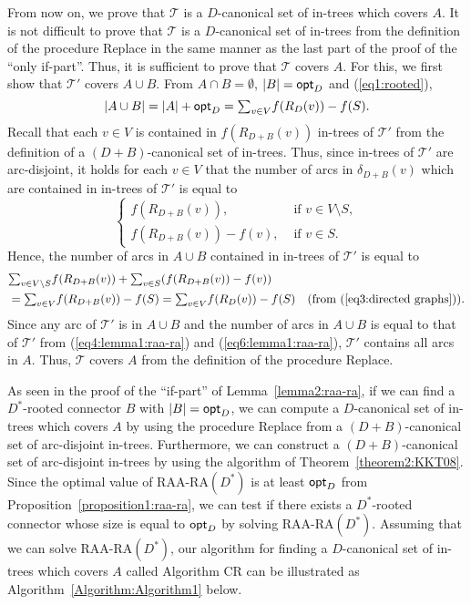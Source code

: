 \documentclass[11pt]{article}
\newcounter{ni}
\theoremstyle{plain}
\newcommand{\eop}{\hfill \usebox{\ProofSym}}
\newenvironment{proof}{\noindent {\it Proof.}}{\eop\par\vspace{0.3cm}}
\begin{document}
\begin{proof}
From now on, we prove that $\mathcal{T}$ is a $D$-canonical set of 
in-trees which covers $A$. 
It is not difficult to prove that $\mathcal{T}$ is a $D$-canonical set of in-trees 
from the definition of the procedure {\sf Replace} in the same manner as the last part 
of the proof of the ``only if-part''. 
Thus, it is sufficient to prove that $\mathcal{T}$ covers $A$. 
For this, we first show that 
$\mathcal{T}'$ covers $A\cup B$. 
From $A \cap B=\emptyset$, $|B|={\sf opt}_D$ and (\ref{eq1:rooted}), 
\begin{equation} \label{eq4:lemma1:raa-ra}
|A\cup B| = |A| + {\sf opt}_D = \mbox{$\sum$}_{v \in V}f(R_D(v)) - f(S). 
\end{equation}
Recall that each $v \in V$ is contained in $f(R_{D+B}(v))$ in-trees of $\mathcal{T}'$
from the definition of a $(D+B)$-canonical set of in-trees. 
Thus, since in-trees of $\mathcal{T}'$ are arc-disjoint, 
it holds for each $v \in V$ that  
the number of arcs in $\delta_{D+B}(v)$
which are contained in in-trees of $\mathcal{T}'$ is equal to 
\begin{equation}
\left\{
\begin{array}{ll}
f(R_{D+B}(v)), & \mbox{ if } v \in V\setminus S,\\
f(R_{D+B}(v)) - f(v), & \mbox{ if } v \in S.  
\end{array}
\right.
\end{equation}
Hence, the number of arcs in $A\cup B$ contained in in-trees of 
$\mathcal{T}'$ is equal to
\begin{align} \label{eq6:lemma1:raa-ra}
&\mbox{$\sum$}_{v \in V\setminus S}f(R_{D+B}(v))+ \mbox{$\sum$}_{v \in S}(f(R_{D+B}(v))-f(v)) \nonumber \\
&=\mbox{$\sum$}_{v \in V}f(R_{D+B}(v)) - f(S) 
=\mbox{$\sum$}_{v \in V}f(R_D(v))-f(S) \ \ \ (\mbox{from (\ref{eq3:directed graphs})}). 
\end{align}
Since any arc of $\mathcal{T}'$ is in $A\cup B$ and the number of arcs in $A\cup B$
is equal to that of $\mathcal{T}'$
from (\ref{eq4:lemma1:raa-ra}) and (\ref{eq6:lemma1:raa-ra}),
$\mathcal{T}'$ contains all arcs in $A$. 
Thus, $\mathcal{T}$ covers $A$ from the definition of the procedure {\sf Replace}. 
\end{proof}

As seen in the proof of the ``if-part'' of Lemma~\ref{lemma2:raa-ra}, 
if we can find a $D^{\ast}$-rooted connector $B$ with $|B|={\sf opt}_D$, 
we can compute a $D$-canonical set of in-trees which covers $A$ by using the procedure 
{\sf Replace} from a $(D+B)$-canonical set of arc-disjoint in-trees. 
Furthermore, we can construct a $(D+B)$-canonical set of arc-disjoint in-trees by using 
the algorithm of Theorem~\ref{theorem2:KKT08}. 
Since the optimal value of $\mbox{RAA-RA}(D^{\ast})$ is at least ${\sf opt}_D$ from Proposition~\ref{proposition1:raa-ra}, 
we can test if there exists a $D^{\ast}$-rooted connector whose size is equal to ${\sf opt}_D$
by solving $\mbox{RAA-RA}(D^{\ast})$. 
Assuming that we can solve $\mbox{RAA-RA}(D^{\ast})$, 
our algorithm for finding a $D$-canonical set of in-trees which covers $A$
called Algorithm {\sf CR} can be illustrated as Algorithm~\ref{Algorithm:Algorithm1} below. 
\end{document}
